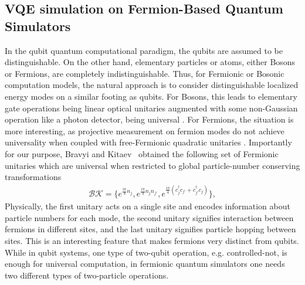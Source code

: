\documentclass[aps, pra, reprint, superscriptaddress]{revtex4-1}
\begin{document}
\subsection{VQE simulation on Fermion-Based Quantum Simulators}
\label{subsec:vqe_fermionic_simulator}

In the qubit quantum computational paradigm, the qubits are  assumed to be distinguishable. On the other hand, elementary particles or atoms, either Bosons or Fermions, are completely indistinguishable. Thus, for Fermionic or Bosonic computation models, the natural approach is to consider distinguishable localized energy modes on a similar footing as qubits. For Bosons, this leads to elementary gate operations being linear optical unitaries augmented with some non-Gaussian operation like a photon detector, being universal \cite{knill2001scheme}. For Fermions, the situation is more interesting, as projective measurement on fermion modes do not achieve universality when coupled with free-Fermionic quadratic unitaries \citep{terhal2002classical}. Importantly for our purpose, Bravyi and Kitaev~\citep{bravyi2002fermionic} obtained the following set of Fermionic unitaries which are universal when restricted to global particle-number conserving transformations
\begin{eqnarray}
    \mathcal{BK} =   \lbrace e^{\frac{i \pi}{4} n_{j}}, e^{\frac{i \pi}{4} n_{j} n_{j'}},
    e^{\frac{i \pi}{4} \left( c_{j}^{\dagger} c_{j'} +  c_{j'}^{\dagger} c_{j} \right) }  \rbrace,
    \label{eq:bravyi-kitaev}
\end{eqnarray}
Physically, the first unitary acts on a single site and encodes information about particle numbers for each mode, the second unitary signifies interaction between fermions in different sites, and the last unitary signifies particle hopping between sites. This is an interesting feature that makes fermions very distinct from qubits. While in qubit systems, one type of two-qubit operation, e.g. controlled-not, is enough for universal computation, in fermionic quantum simulators one needs two different types of two-particle operations. 
\end{document}
